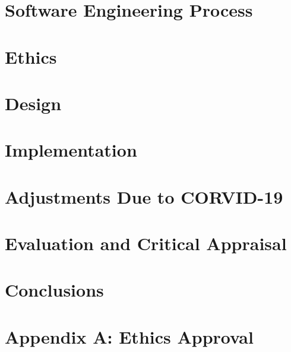 \documentclass{article}
\begin{document}
\section{Software Engineering Process}
\label{section:proc}


\section{Ethics}
\label{section:ethi}


\section{Design}
\label{section:des}


\section{Implementation}
\label{section:impl}


\section{Adjustments Due to CORVID-19}
\label{section:corvid}


\section{Evaluation and Critical Appraisal}
\label{section:eval}


\section{Conclusions}
\label{section:conc}


\newpage

\nocite{*}
\printbibliography

\appendix
\newpage
%

%

\section{Appendix A: Ethics Approval}
\label{section:ethics_append}

\end{document}
